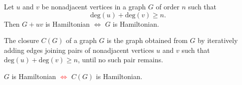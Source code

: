 \begin{frame}{}
  \begin{theorem}
    Let $u$ and $v$ be nonadjacent vertices in a graph $G$ of order $n$ such that
    \[
      \text{deg}(u) + \text{deg}(v) \ge n.
    \]
    Then $G + uv$ is Hamiltonian $\iff$ $G$ is Hamiltonian.
  \end{theorem}

  \pause
  \vspace{0.50cm}
  \begin{definition}[Closure $C(G)$]
    The closure $C(G)$ of a graph $G$ is the graph obtained from $G$
    by iteratively adding edges joining pairs of nonadjacent vertices
    $u$ and $v$ such that $\text{deg}(u) + \text{deg}(v) \ge n$,
    until no such pair remains.
  \end{definition}
\end{frame}

\begin{frame}{}
  \begin{theorem}
    $G$ is Hamiltonian \textcolor<2->{red}{$\iff$} $C(G)$ is Hamiltonian.
  \end{theorem}
  
  \vspace{0.50cm}

  \vspace{0.50cm}
\end{frame}

